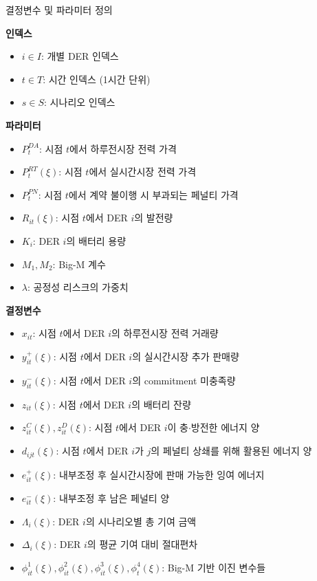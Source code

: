 \documentclass[xcolor=dvipsnames,t,9pt]{beamer}
\begin{document}
\begin{frame}{결정변수 및 파라미터 정의}
    \small
    \begin{minipage}[t]{0.37\textwidth}
        \textbf{인덱스}
        \begin{itemize}
            \item $i \in I$: 개별 DER 인덱스
            \item $t \in T$: 시간 인덱스 (1시간 단위)
            \item $s \in S$: 시나리오 인덱스
        \end{itemize}
        \vspace{0.5em}
        \textbf{파라미터}
        \begin{itemize}
            \item $P_t^{DA}$: 시점 $t$에서 하루전시장 전력 가격
            \item $P_t^{RT}(\xi)$: 시점 $t$에서 실시간시장 전력 가격
            \item $P_t^{PN}$: 시점 $t$에서 계약 불이행 시 부과되는 페널티 가격
            \item $R_{it}(\xi)$: 시점 $t$에서 DER $i$의 발전량
            \item $K_i$: DER $i$의 배터리 용량
            \item $M_1, M_2$: Big-M 계수
            \item $\lambda$: 공정성 리스크의 가중치
        \end{itemize}
    \end{minipage}
    \hfill
    \begin{minipage}[t]{0.58\textwidth}
        \textbf{결정변수}
        \begin{itemize}
            \item $x_{it}$: 시점 $t$에서 DER $i$의 하루전시장 전력 거래량
            \item $y_{it}^{+}(\xi)$: 시점 $t$에서 DER $i$의 실시간시장 추가 판매량
            \item $y_{it}^{-}(\xi)$: 시점 $t$에서 DER $i$의 commitment 미충족량
            \item $z_{it}(\xi)$: 시점 $t$에서 DER $i$의 배터리 잔량
            \item $z^C_{it}(\xi), z^D_{it}(\xi)$: 시점 $t$에서 DER $i$이 충$\cdot$방전한 에너지 양
            \item $d_{ijt}(\xi)$: 시점 $t$에서 DER $i$가 $j$의 페널티 상쇄를 위해 활용된 에너지 양
            \item $e^+_{it}(\xi)$: 내부조정 후 실시간시장에 판매 가능한 잉여 에너지
            \item $e^-_{it}(\xi)$: 내부조정 후 남은 페널티 양
            \item $\Lambda_i(\xi)$: DER $i$의 시나리오별 총 기여 금액
            \item $\Delta_i(\xi)$: DER $i$의 평균 기여 대비 절대편차
            \item $\phi^1_{it}(\xi), \phi^2_{it}(\xi), \phi^3_{it}(\xi), \phi^4_{t}(\xi)$: Big-M 기반 이진 변수들
        \end{itemize}
    \end{minipage}
\end{frame}
\end{document}
